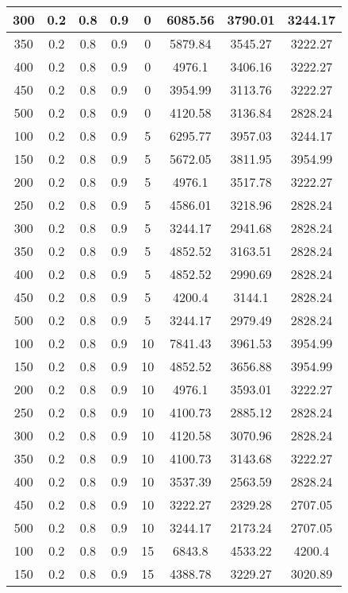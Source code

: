 \documentclass[a4paper, 12pt]{extreport}
\begin{document}
\begin{itemize}
\begin{longtable}{|c|c|c|c|c|c|c|c|}
			300 & 0.2 & 0.8 & 0.9 & 0 & 6085.56 & 3790.01 & 3244.17 \\\hline
			350 & 0.2 & 0.8 & 0.9 & 0 & 5879.84 & 3545.27 & 3222.27 \\\hline
			400 & 0.2 & 0.8 & 0.9 & 0 & 4976.1 & 3406.16 & 3222.27 \\\hline
			450 & 0.2 & 0.8 & 0.9 & 0 & 3954.99 & 3113.76 & 3222.27 \\\hline
			500 & 0.2 & 0.8 & 0.9 & 0 & 4120.58 & 3136.84 & 2828.24 \\\hline
			100 & 0.2 & 0.8 & 0.9 & 5 & 6295.77 & 3957.03 & 3244.17 \\\hline
			150 & 0.2 & 0.8 & 0.9 & 5 & 5672.05 & 3811.95 & 3954.99 \\\hline
			200 & 0.2 & 0.8 & 0.9 & 5 & 4976.1 & 3517.78 & 3222.27 \\\hline
			250 & 0.2 & 0.8 & 0.9 & 5 & 4586.01 & 3218.96 & 2828.24 \\\hline
			300 & 0.2 & 0.8 & 0.9 & 5 & 3244.17 & 2941.68 & 2828.24 \\\hline
			350 & 0.2 & 0.8 & 0.9 & 5 & 4852.52 & 3163.51 & 2828.24 \\\hline
			400 & 0.2 & 0.8 & 0.9 & 5 & 4852.52 & 2990.69 & 2828.24 \\\hline
			450 & 0.2 & 0.8 & 0.9 & 5 & 4200.4 & 3144.1 & 2828.24 \\\hline
			500 & 0.2 & 0.8 & 0.9 & 5 & 3244.17 & 2979.49 & 2828.24 \\\hline
			100 & 0.2 & 0.8 & 0.9 & 10 & 7841.43 & 3961.53 & 3954.99 \\\hline
			150 & 0.2 & 0.8 & 0.9 & 10 & 4852.52 & 3656.88 & 3954.99 \\\hline
			200 & 0.2 & 0.8 & 0.9 & 10 & 4976.1 & 3593.01 & 3222.27 \\\hline
			250 & 0.2 & 0.8 & 0.9 & 10 & 4100.73 & 2885.12 & 2828.24 \\\hline
			300 & 0.2 & 0.8 & 0.9 & 10 & 4120.58 & 3070.96 & 2828.24 \\\hline
			350 & 0.2 & 0.8 & 0.9 & 10 & 4100.73 & 3143.68 & 3222.27 \\\hline
			400 & 0.2 & 0.8 & 0.9 & 10 & 3537.39 & 2563.59 & 2828.24 \\\hline
			450 & 0.2 & 0.8 & 0.9 & 10 & 3222.27 & 2329.28 & 2707.05 \\\hline
			500 & 0.2 & 0.8 & 0.9 & 10 & 3244.17 & 2173.24 & 2707.05 \\\hline
			100 & 0.2 & 0.8 & 0.9 & 15 & 6843.8 & 4533.22 & 4200.4 \\\hline
			150 & 0.2 & 0.8 & 0.9 & 15 & 4388.78 & 3229.27 & 3020.89 \\\hline

\end{longtable}
\end{itemize}
\end{document}
